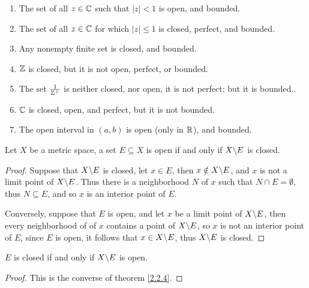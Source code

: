 \begin{example}
    \begin{enumerate}[label=(\arabic*)]
        \item The set of all $z \in \mathbb{C}$ such that $|z|<1$ is open, and bounded.

        \item The set of all $z \in \mathbb{C}$ for which  $|z| \leq 1$ is closed, perfect, and bounded.

        \item Any nonempty finite set is closed, and bounded.

        \item $\mathbb{Z}$ is closed, but it is not open, perfect, or bounded.

        \item The set  $ \frac{1}{\mathbb{Z}^+}$ is neither closed, nor open, it is not perfect; but it 
            is bounded..

        \item $\mathbb{C}$ is closed, open, and perfect, but it is not bounded.

        \item The open interval in  $(a,b)$ is open (only in $\mathbb{R}$), and bounded.
    \end{enumerate}		
\end{example} 

\begin{theorem}\label{2.2.5}
    Let $X$ be a metric space, a set  $E \subseteq X$ is open if and only if  $X \backslash E$ is 
    closed.
\end{theorem}
\begin{proof}
    Suppose that $X \backslash E$ is closed, let  $x \in E$, then  $x \notin X \backslash E$, and $x$ is 
    not a limit point of  $X \backslash E$. Thus there is a neighborhood $N$ of  $x$ such 
    that $N \cap E=\emptyset$, thus $N \subseteq E$, and so $x$ is an interior point of  $E$.

    Conversely, suppose that  $E$ is open, and let  $x$ be a limit point of  $X \backslash E$, 
    then every neighborhood of of  $x$ contains a point of  $X \backslash E$, so  $x$ is not 
    an interior point of  $E$, since  $E$ is open, it follows that  $x \in X \backslash E$, thus 
    $X \backslash E$ is closed.
\end{proof}

\begin{corollary}
    $E$ is closed if and only if  $X \backslash E$ is open.
\end{corollary}
\begin{proof}
    This is the converse of theorem \ref{2.2.4}.		
\end{proof}

